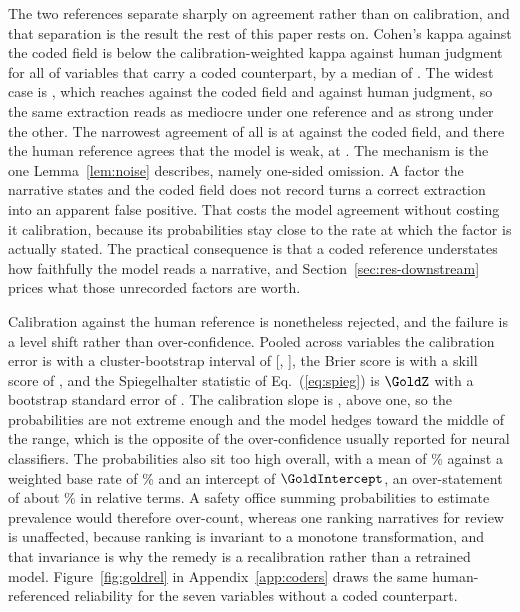 The two references separate sharply on agreement rather than on calibration, and that
separation is the result the rest of this paper rests on. Cohen's kappa against the coded field
is below the calibration-weighted kappa against human judgment for all \KappaGapNPositive{} of
\KappaGapN{} variables that carry a coded counterpart, by a median of \KappaGapMedian{}. The
widest case is \KappaGapMaxVar{}, which reaches \KappaGapMaxCoded{} against the coded field and
\KappaGapMaxHuman{} against human judgment, so the same extraction reads as mediocre under one
reference and as strong under the other. The narrowest agreement of all is \KappaCodedMinVar{}
at \KappaCodedMin{} against the coded field, and there the human reference agrees that the model
is weak, at \KappaCodedMinHuman{}. The mechanism is the one Lemma~\ref{lem:noise} describes,
namely one-sided omission. A factor the narrative states and the coded field does not record
turns a correct extraction into an apparent false positive. That costs the model agreement
without costing it calibration, because its probabilities stay close to the rate at which the
factor is actually stated. The practical consequence is that a coded reference
understates how faithfully the model reads a narrative, and Section~\ref{sec:res-downstream}
prices what those unrecorded factors are worth.

Calibration against the human reference is nonetheless rejected, and the failure is a level
shift rather than over-confidence. Pooled across variables the calibration error is \GoldECE{}
with a cluster-bootstrap interval of [\GoldECElo{}, \GoldECEhi{}], the Brier score is
\GoldBrier{} with a skill score of \GoldBSS{}, and the Spiegelhalter statistic of
Eq.~(\ref{eq:spieg}) is $\GoldZ$ with a bootstrap standard error of \GoldZSE{}. The calibration
slope is \GoldSlope{}, above one, so the probabilities are not extreme enough and the model
hedges toward the middle of the range, which is the opposite of the over-confidence usually
reported for neural classifiers. The probabilities also sit too high overall, with a mean of
\GoldExpectedP\% against a weighted base rate of \GoldBaseRate\% and an intercept of
$\GoldIntercept$, an over-statement of about \GoldRelExcess\% in relative terms. A safety
office summing probabilities to estimate prevalence would therefore over-count, whereas one
ranking narratives for review is unaffected, because ranking is invariant to a monotone
transformation, and that invariance is why the remedy is a recalibration rather than a
retrained model. Figure~\ref{fig:goldrel} in Appendix~\ref{app:coders} draws the same
human-referenced reliability for the seven variables without a coded counterpart.

